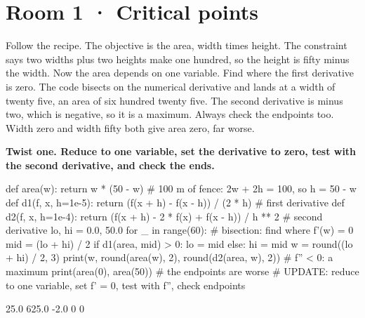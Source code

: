 \documentclass[11pt,a4paper]{report}
\begin{document}
\section*{Room 1 · Critical points}
Follow the recipe. The objective is the area, width times height. The constraint says two widths plus two heights make one hundred, so the height is fifty minus the width. Now the area depends on one variable. Find where the first derivative is zero. The code bisects on the numerical derivative and lands at a width of twenty five, an area of six hundred twenty five. The second derivative is minus two, which is negative, so it is a maximum. Always check the endpoints too. Width zero and width fifty both give area zero, far worse.
\begin{tcolorbox}[colback=yellow!12,colframe=orange!70!black,boxrule=0.4pt,left=4pt,right=4pt,top=2pt,bottom=2pt]\textbf{Twist one. Reduce to one variable, set the derivative to zero, test with the second derivative, and check the ends.}\end{tcolorbox}
\begin{Code}
def area(w): return w * (50 - w)            # 100 m of fence: 2w + 2h = 100, so h = 50 - w
def d1(f, x, h=1e-5): return (f(x + h) - f(x - h)) / (2 * h)            # first derivative
def d2(f, x, h=1e-4): return (f(x + h) - 2 * f(x) + f(x - h)) / h ** 2  # second derivative
lo, hi = 0.0, 50.0
for _ in range(60):                         # bisection: find where f'(w) = 0
    mid = (lo + hi) / 2
    if d1(area, mid) > 0: lo = mid
    else: hi = mid
w = round((lo + hi) / 2, 3)
print(w, round(area(w), 2), round(d2(area, w), 2))      # f'' < 0: a maximum
print(area(0), area(50))                    # the endpoints are worse
# UPDATE: reduce to one variable, set f' = 0, test with f'', check endpoints
\end{Code}
\begin{Out}
25.0 625.0 -2.0
0 0
\end{Out}
\end{document}
